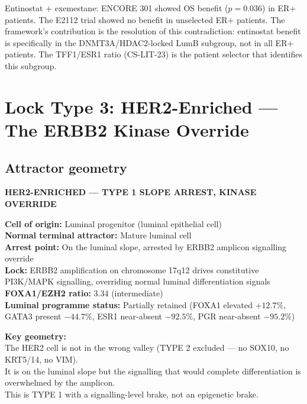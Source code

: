\documentclass[12pt, a4paper]{article}
\begin{document}
Entinostat $+$ exemestane: ENCORE 301 showed OS
benefit ($p=0.036$) in ER$+$ patients. The E2112
trial showed no benefit in unselected ER$+$ patients.
The framework's contribution is the resolution of
this contradiction: entinostat benefit is specifically
in the DNMT3A/HDAC2-locked LumB subgroup, not in
all ER$+$ patients. The TFF1/ESR1 ratio (CS-LIT-23)
is the patient selector that identifies this subgroup.

\section{Lock Type 3: HER2-Enriched --- The ERBB2
Kinase Override}

\subsection{Attractor geometry}

\begin{center}
\colorbox{mechanismbox}{
\begin{minipage}{0.85\textwidth}
\vspace{0.5em}
\textbf{HER2-ENRICHED --- TYPE 1 SLOPE ARREST,
KINASE OVERRIDE}

\medskip
\textbf{Cell of origin:} Luminal progenitor
(luminal epithelial cell)\\
\textbf{Normal terminal attractor:} Mature luminal cell\\
\textbf{Arrest point:} On the luminal slope, arrested
by ERBB2 amplicon signalling override\\
\textbf{Lock:} ERBB2 amplification on chromosome 17q12
drives constitutive PI3K/MAPK signalling, overriding
normal luminal differentiation signals\\
\textbf{FOXA1/EZH2 ratio:} 3.34 (intermediate)\\
\textbf{Luminal programme status:} Partially retained
(FOXA1 elevated $+12.7\%$, GATA3 present $-44.7\%$,
ESR1 near-absent $-92.5\%$, PGR near-absent $-95.2\%$)

\medskip
\textbf{Key geometry:}\\
The HER2 cell is not in the wrong valley (TYPE 2 excluded
--- no SOX10, no KRT5/14, no VIM).\\
It is on the luminal slope but the signalling that would
complete differentiation is overwhelmed by the amplicon.\\
This is TYPE 1 with a signalling-level brake, not an
epigenetic brake.
\vspace{0.5em}
\end{minipage}
}
\end{center}
\end{document}
